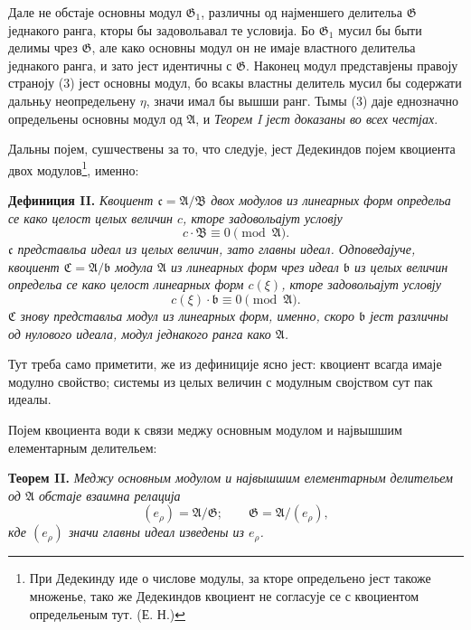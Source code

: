 \documentclass[11pt]{article}
\providecommand{\Amod}{\mathfrak A}
\providecommand{\Bmod}{\mathfrak B}
\providecommand{\Gmod}{\mathfrak G}
\providecommand{\bb}{\mathfrak b}
\providecommand{\cc}{\mathfrak c}
\providecommand{\zero}[1]{\equiv 0\pmod{#1}}
\begin{document}
Дале не обстаје основны модул $\Gmod_1$, различны од најменшего делительа $\Gmod$ једнакого ранга, кторы бы задовольавал те условија. Бо $\Gmod_1$ мусил бы быти делимы чрез $\Gmod$, але како основны модул он не имаје властного делительа једнакого ранга, и зато јест идентичны с $\Gmod$. Наконец модул представјены правоју страноју (3) јест основны модул, бо всакы властны делитель мусил бы содержати дальньу неопредельену $\eta$, значи имал бы вышши ранг. Тымы (3) даје еднозначно определьены основны модул од $\Amod$, и \emph{Теорем I јест доказаны во всех честјах}.

Дальны појем, сушчествены за то, что следује, јест Дедекиндов појем квоциента двох модулов\footnote{При Дедекинду иде о числове модулы, за кторе определьено јест такоже множенье, тако же Дедекиндов квоциент не согласује се с квоциентом определьеным тут. (Е. Н.)}, именно:

\medskip
\noindent\textbf{Дефиниция II.} \emph{Квоциент $\cc=\Amod/\Bmod$ двох модулов из линеарных форм определьа се како целост целых величин $c$, кторе задовольајут условју}
\[
 c\cdot\Bmod\zero{\Amod}.
\]
\emph{$\cc$ представльа идеал из целых величин, зато главны идеал. Одповедајуче, квоциент $\mathfrak C=\Amod/\bb$ модула $\Amod$ из линеарных форм чрез идеал $\bb$ из целых величин определьа се како целост линеарных форм $c(\xi)$, кторе задовольајут условју}
\[
 c(\xi)\cdot\bb\zero{\Amod}.
\]
\emph{$\mathfrak C$ знову представльа модул из линеарных форм, именно, скоро $\bb$ јест различны од нулового идеала, модул једнакого ранга како $\Amod$.}

Тут треба само приметити, же из дефиниције ясно јест: квоциент всагда имаје модулно свойство; системы из целых величин с модулным својством сут пак идеалы.

Појем квоциента води к связи меджу основным модулом и највышшим елементарным делительем:

\medskip
\noindent\textbf{Теорем II.} \emph{Меджу основным модулом и највышшим елементарным делительем од $\Amod$ обстаје взаимна релација}
\begin{equation}
 (e_\rho)=\Amod/\Gmod;\qquad \Gmod=\Amod/(e_\rho),
\tag{5}
\end{equation}
\emph{кде $(e_\rho)$ значи главны идеал изведены из $e_\rho$.}
\end{document}
